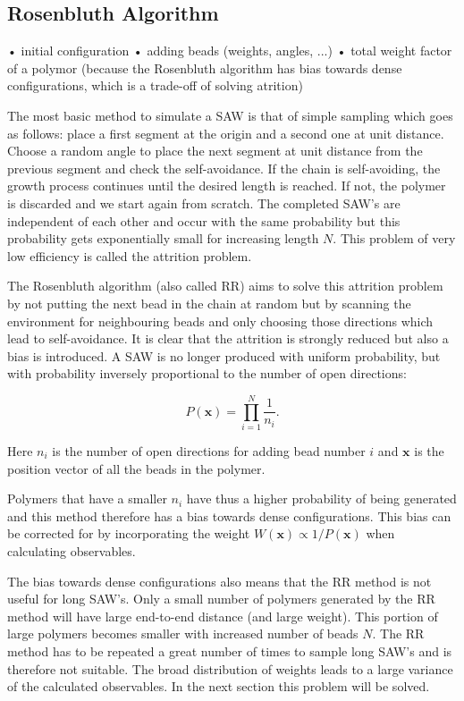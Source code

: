 \subsection*{Rosenbluth Algorithm}
		• initial configuration
		• adding beads (weights, angles, ...)
		• total weight factor of a polymor (because the Rosenbluth algorithm has bias towards dense configurations, which is a trade-off of solving atrition)

The most basic method to simulate a SAW is that of simple sampling which goes as follows: place a first segment at the origin and a second one at unit distance. Choose a random angle to place the next segment at unit distance from the previous segment and check the self-avoidance. If the chain is self-avoiding, the growth process continues until the desired length is reached. If not, the polymer is discarded and we start again from scratch. The completed SAW's are independent of each other and occur with the same probability but this probability gets exponentially small for increasing length $N$. This problem of very low efficiency is called the attrition problem.

The Rosenbluth algorithm (also called RR) aims to solve this attrition problem by not putting the next bead in the chain at random but by scanning the environment for neighbouring beads and only choosing those directions which lead to self-avoidance. It is clear that the attrition is strongly reduced but also a bias is introduced. A SAW is no longer produced with uniform probability, but with probability inversely proportional to the number of open directions:

\begin{equation} \label{eq:prob_RR}
	P\!\left(\mathbf{x}\right) = \prod_{i=1}^{N} \frac{1}{n_i} .
\end{equation}

Here $n_i$ is the number of open directions for adding bead number $i$ and $\mathbf{x}$ is the position vector of all the beads in the polymer.

Polymers that have a smaller $n_i$ have thus a higher probability of being generated and this method therefore has a bias towards dense configurations. This bias can be corrected for by incorporating the weight $W\!\left( \mathbf{x} \right) \propto 1/ P\!\left( \mathbf{x} \right)$ when calculating observables.

The bias towards dense configurations also means that the RR method is not useful for long SAW's. Only a small number of polymers generated by the RR method will have large end-to-end distance (and large weight). This portion of large polymers becomes smaller with increased number of beads $N$. The RR method has to be repeated a great number of times to sample long SAW's and is therefore not suitable. The broad distribution of weights leads to a large variance of the calculated observables. In the next section this problem will be solved.

